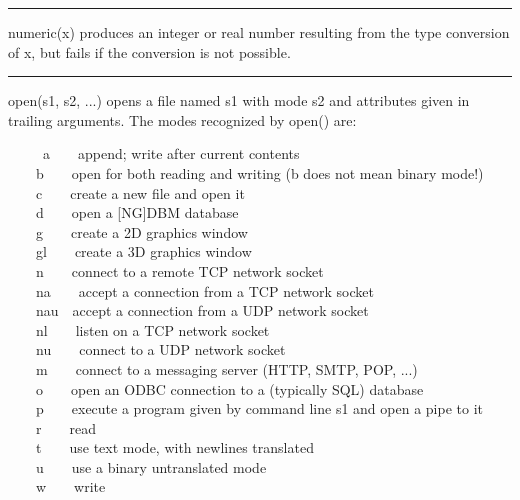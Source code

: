 \bigskip\hrule\vspace{0.1cm}

\noindent
{}\textsf{numeric(x)} produces an integer or real
number resulting from the type conversion of \textsf{x}, but fails if
the conversion is not possible.

\bigskip\hrule\vspace{0.1cm}

\noindent
{}\textsf{open(s1, s2, ...)} opens a file named
\textsf{s1} with mode \textsf{s2} and attributes given in trailing
arguments. The modes recognized by \textsf{open()} are: 

\ \ \ \ \ \textsf{{\textquotedbl}a{\textquotedbl}\ \ \ \ }append; write
after current contents\\
 \ \ \ \ \textsf{{\textquotedbl}b{\textquotedbl}\ \ \ \ }open for both
reading and writing (b does not mean binary mode!)\\
 \ \ \ \ \textsf{{\textquotedbl}c{\textquotedbl}\ \ \ \ }create a new
file and open it\\
 \ \ \ \ \textsf{{\textquotedbl}d{\textquotedbl}\ \ \ \ }open a
[NG]DBM database\\
 \ \ \ \ \textsf{{\textquotedbl}g{\textquotedbl}\ \ \ \ }create a 2D
graphics window\\
 \ \ \ \ \textsf{{\textquotedbl}gl{\textquotedbl}\ \ \ \ }create a 3D
graphics window\\
 \ \ \ \ \textsf{{\textquotedbl}n{\textquotedbl}\ \ \ \ }connect to a
remote TCP network socket\\
 \ \ \ \ \textsf{{\textquotedbl}na{\textquotedbl}\ \ \ \ }accept a
connection from a TCP network socket \\
 \ \ \ \ \textsf{{\textquotedbl}nau{\textquotedbl}\ \ }accept a
connection from a UDP network socket\\
 \ \ \ \ \textsf{{\textquotedbl}nl{\textquotedbl}\ \ \ \ }listen on a
TCP network socket \\
 \ \ \ \ \textsf{{\textquotedbl}nu{\textquotedbl}\ \ \ \ }connect to a
UDP network socket\\
 \ \ \ \ \textsf{{\textquotedbl}m{\textquotedbl}\ \ \ \ }connect to a
messaging server (HTTP, SMTP, POP, ...)\\
 \ \ \ \ \textsf{{\textquotedbl}o{\textquotedbl}\ \ \ \ }open an
ODBC connection to a (typically SQL)
database\\
 \ \ \ \ \textsf{{\textquotedbl}p{\textquotedbl}\ \ \ \ }execute a
program given by command line s1 and open a pipe to it\\
 \ \ \ \ \textsf{{\textquotedbl}r{\textquotedbl}\ \ \ \ }read\\
 \ \ \ \ \textsf{{\textquotedbl}t{\textquotedbl}\ \ \ \ }use text mode,
with newlines translated\\
 \ \ \ \ \textsf{{\textquotedbl}u{\textquotedbl}\ \ \ \ }use a binary
untranslated mode\\
 \ \ \ \ \textsf{{\textquotedbl}w{\textquotedbl}\ \ \ \ }write

